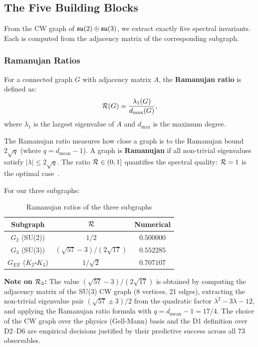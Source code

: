 \subsection{The Five Building Blocks}\label{sec:building_blocks}

From the CW graph of $\mathfrak{su}(2) \oplus \mathfrak{su}(3)$, we extract exactly five spectral invariants. Each is computed from the adjacency matrix of the corresponding subgraph.

\subsubsection{Ramanujan Ratios}

For a connected graph $G$ with adjacency matrix $A$, the \textbf{Ramanujan ratio} is defined as:
\begin{equation}
\mathcal{R}(G) = \frac{\lambda_1(G)}{d_{\mathrm{max}}(G)},
\end{equation}
where $\lambda_1$ is the largest eigenvalue of $A$ and $d_{\mathrm{max}}$ is the maximum degree.

The Ramanujan ratio measures how close a graph is to the Ramanujan bound $2\sqrt{q}$ (where $q = d_{\mathrm{mean}} - 1$). A graph is \textbf{Ramanujan} if all non-trivial eigenvalues satisfy $|\lambda| \leq 2\sqrt{q}$. The ratio $\mathcal{R} \in (0, 1]$ quantifies the spectral quality: $\mathcal{R} = 1$ is the optimal case~\cite{lubotzky1988ramanujan,margulis1975explicit}.

For our three subgraphs:

\begin{table}[h]
\centering
\caption{Ramanujan ratios of the three subgraphs}
\begin{tabular}{ccc}
\hline\hline
Subgraph & $\mathcal{R}$ & Numerical \\
\hline
$G_2$ (SU(2)) & $1/2$ & $0.500000$ \\
$G_3$ (SU(3)) & $(\sqrt{57}-3)/(2\sqrt{17})$ & $0.552285$ \\
$G_{EE}$ ($K_2 \square K_3$) & $1/\sqrt{2}$ & $0.707107$ \\
\hline\hline
\end{tabular}
\end{table}

\textbf{Note on $\mathcal{R}_3$:} The value $(\sqrt{57}-3)/(2\sqrt{17})$ is obtained by computing the adjacency matrix of the SU(3) CW graph (8 vertices, 21 edges), extracting the non-trivial eigenvalue pair $(\sqrt{57} \pm 3)/2$ from the quadratic factor $\lambda^2 - 3\lambda - 12$, and applying the Ramanujan ratio formula with $q = d_{\mathrm{mean}} - 1 = 17/4$. The choice of the CW graph over the physics (Gell-Mann) basis and the D1 definition over D2--D6 are empirical decisions justified by their predictive success across all 73 observables.

